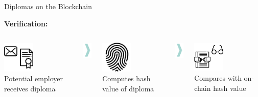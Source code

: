 \documentclass[]{beamer}
\begin{document}
\begin{frame}{Diplomas on the Blockchain}
\begin{minipage}{\linewidth}
	\end{minipage}\vfill
	\vspace{0.5cm}
	\begin{minipage}{\linewidth}
	\textbf{\large{Verification:}}
	\begin{columns}
		\begin{column}{0.3\textwidth}
			\centering
			\includegraphics[width=1.5cm]{../assets/images/receive_diploma.png}\\
			Potential employer receives diploma
		\end{column}
		\begin{column}{0.05\textwidth}
			\includegraphics[width=0.75cm]{../assets/images/big_arrow.png}
		\end{column}
		\begin{column}{0.3\textwidth}
			\centering
			\includegraphics[width=1.5cm]{../assets/images/fingerprint.png}\\
			Computes hash value of diploma
		\end{column}
		\begin{column}{0.05\textwidth}
			\includegraphics[width=0.75cm]{../assets/images/big_arrow.png}
		\end{column}
		\begin{column}{0.3\textwidth}
			\centering
			\includegraphics[width=1.5cm]{../assets/images/verify_onchain.png}\\
			Compares with on-chain hash value
		\end{column}
	\end{columns}
\end{minipage}
\end{frame}
\end{document}
